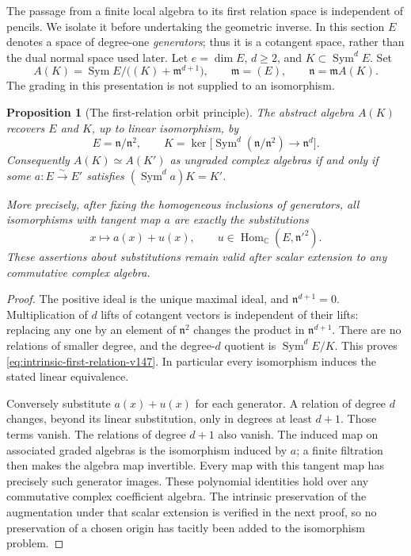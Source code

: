 \documentclass[11pt,reqno]{amsart}
\numberwithin{equation}{section}
\newtheorem{proposition}[theorem]{Proposition}
\theoremstyle{definition}\newtheorem{definition}[theorem]{Definition}
\theoremstyle{remark}\newtheorem{remark}[theorem]{Remark}
\newcommand{\C}{\mathbb C}\newcommand{\Q}{\mathbb Q}
\DeclareMathOperator{\Sym}{Sym}\DeclareMathOperator{\Gr}{Gr}
\DeclareMathOperator{\Hom}{Hom}\DeclareMathOperator{\Tot}{Tot}
\begin{document}
The passage from a finite local algebra to its first relation space is
independent of pencils.  We isolate it before undertaking the geometric
inverse.  In this section \(E\) denotes a space of degree-one
\emph{generators}; thus it is a cotangent space, rather than the dual
normal space used later.  Let \(e=\dim E\), \(d\ge2\), and
\(K\subset\Sym^d E\).  Set
\begin{equation}\label{eq:general-first-algebra-v147}
 A(K)=\Sym E/\bigl((K)+\mathfrak m^{d+1}\bigr),
 \qquad \mathfrak m=(E),\qquad \mathfrak n=\mathfrak m A(K).
\end{equation}
The grading in this presentation is not supplied to an isomorphism.

\begin{proposition}[The first-relation orbit principle]
\label{prop:first-relation-orbit-v147}
The abstract algebra \(A(K)\) recovers \(E\) and \(K\), up to
linear isomorphism, by
\begin{equation}\label{eq:intrinsic-first-relation-v147}
 E=\mathfrak n/\mathfrak n^2,\qquad
 K=\ker\bigl[\Sym^d(\mathfrak n/\mathfrak n^2)
                                    \longrightarrow\mathfrak n^d\bigr].
\end{equation}
Consequently \(A(K)\simeq A(K')\) as ungraded complex algebras
if and only if some \(a:E\xrightarrow{\sim}E'\) satisfies
\((\Sym^d a)K=K'\).

More precisely, after fixing the homogeneous inclusions of generators,
all isomorphisms with tangent map \(a\) are exactly the substitutions
\[
                 x\longmapsto a(x)+u(x),\qquad
                 u\in\Hom_{\C}(E,\mathfrak n'^2).
\]
These assertions about substitutions remain valid after scalar
extension to any commutative complex algebra.
\end{proposition}
\begin{proof}
The positive ideal is the unique maximal ideal, and
\(\mathfrak n^{d+1}=0\).  Multiplication of \(d\) lifts of
cotangent vectors is independent of their lifts: replacing any one
by an element of \(\mathfrak n^2\) changes the product in
\(\mathfrak n^{d+1}\).  There are no relations of smaller degree,
and the degree-\(d\) quotient is \(\Sym^d E/K\).  This proves
\eqref{eq:intrinsic-first-relation-v147}.  In particular every
isomorphism induces the stated linear equivalence.

Conversely substitute \(a(x)+u(x)\) for each generator.  A relation
of degree \(d\) changes, beyond its linear substitution, only in
degrees at least \(d+1\).  Those terms vanish.  The relations of
degree \(d+1\) also vanish.  The induced map on associated graded
algebras is the isomorphism induced by \(a\); a finite filtration
then makes the algebra map invertible.  Every map with this tangent
map has precisely such generator images.  These polynomial identities
hold over any commutative complex coefficient algebra.  The intrinsic
preservation of the augmentation under that scalar extension is
verified in the next proof, so no preservation of a chosen origin has
tacitly been added to the isomorphism problem.
\end{proof}
\end{document}
